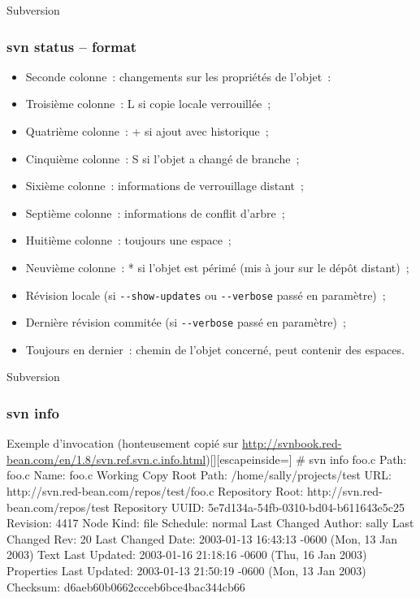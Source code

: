 \begin{frame}[fragile]{Subversion}
\frametitle{svn status -- format}
\begin{itemize}[<+->]
 \item Seconde colonne~: changements sur les propriétés de l'objet~:
 \item Troisième colonne~: L si copie locale verrouillée~;
 \item Quatrième colonne~: + si ajout avec historique~;
 \item Cinquième colonne~: S si l'objet a changé de branche~;
 \item Sixième colonne~: informations de verrouillage distant~;
 \item Septième colonne~: informations de conflit d'arbre~;
 \item Huitième colonne~: toujours une espace~;
 \item Neuvième colonne~: * si l'objet est périmé (mis à jour sur le dépôt distant)~;
 \item Révision locale (si \verb/--show-updates/ ou \verb/--verbose/ passé en paramètre)~;
 \item Dernière révision commitée (si \verb/--verbose/ passé en paramètre)~;
 \item Toujours en dernier~: chemin de l'objet concerné, peut contenir des espaces.
\end{itemize}
\end{frame}

\begin{frame}[fragile]{Subversion}
\frametitle{svn info}
\begin{snvlisting}{Exemple d'invocation (honteusement copié sur \url{http://svnbook.red-bean.com/en/1.8/svn.ref.svn.c.info.html})}[][escapeinside={}]
# svn info foo.c
Path: foo.c
Name: foo.c
Working Copy Root Path: /home/sally/projects/test
URL: http://svn.red-bean.com/repos/test/foo.c
Repository Root: http://svn.red-bean.com/repos/test
Repository UUID: 5e7d134a-54fb-0310-bd04-b611643e5c25
Revision: 4417
Node Kind: file
Schedule: normal
Last Changed Author: sally
Last Changed Rev: 20
Last Changed Date: 2003-01-13 16:43:13 -0600 (Mon, 13 Jan 2003)
Text Last Updated: 2003-01-16 21:18:16 -0600 (Thu, 16 Jan 2003)
Properties Last Updated: 2003-01-13 21:50:19 -0600 (Mon, 13 Jan 2003)
Checksum: d6aeb60b0662ccceb6bce4bac344cb66
\end{snvlisting}
\end{frame}

